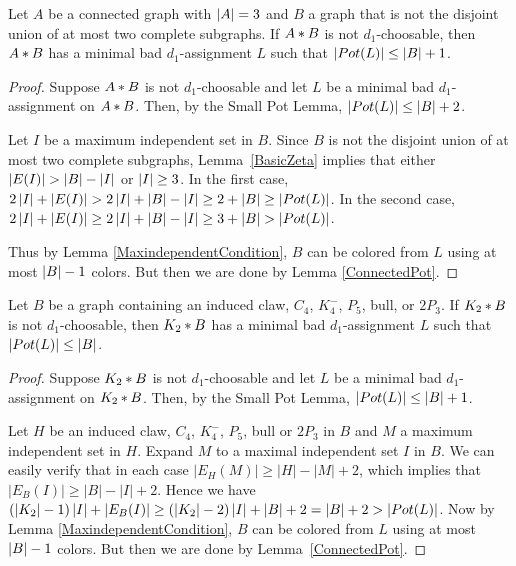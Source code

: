 \begin{lem}\label{ConnectedEqual3}
Let $A$ be a connected graph with $\left|A\right| = 3$ and $B$ a graph that is not the disjoint union of at most two complete subgraphs.  If $A \mbox{\hspace{2 pt}$\ast$\hspace{2 pt}} B$ is not $d_1$-choosable, then $A \mbox{\hspace{2 pt}$\ast$\hspace{2 pt}} B$ has a minimal bad $d_1$-assignment $L$ such that $\left|Pot(L)\right| \leq \left|B\right| + 1$.
\end{lem}
\begin{proof}
Suppose $A \mbox{\hspace{2 pt}$\ast$\hspace{2 pt}} B$ is not $d_1$-choosable and let $L$ be a minimal bad $d_1$-assignment on $A \mbox{\hspace{2 pt}$\ast$\hspace{2 pt}} B$.  Then, by the Small Pot Lemma, $\left|Pot(L)\right| \leq \left|B\right| + 2$.  

Let $I$ be a maximum independent set in $B$. Since $B$ is not the disjoint union of
at most two complete subgraphs, Lemma~\ref{BasicZeta} implies that either
$\left|E(I)\right| > \left|B\right| - \left|I\right|$ or $\left|I\right| \geq 3$.  In the first case, $2\left|I\right| + \left|E(I)\right| > 2\left|I\right| + \left|B\right| - \left|I\right| \geq 2 + \left|B\right| \geq \left|Pot(L)\right|$.  In the second case, 
$2\left|I\right| + \left|E(I)\right| \geq 2\left|I\right| + \left|B\right| - \left|I\right| \geq 3 + \left|B\right| > \left|Pot(L)\right|$.

Thus by Lemma \ref{MaxindependentCondition}, $B$ can be colored from $L$ using at most $\left|B\right| - 1$ colors.  But then we are done by Lemma \ref{ConnectedPot}.
\end{proof}

\begin{lem}\label{ConnectedIsK2}
Let $B$ be a graph containing an induced claw, $C_4$, $K_4^-$, $P_5$, bull, or $2P_3$. If $K_2 \mbox{\hspace{2 pt}$\ast$\hspace{2 pt}} B$ is not $d_1$-choosable, then $K_2 \mbox{\hspace{2 pt}$\ast$\hspace{2 pt}} B$ has a minimal bad $d_1$-assignment $L$ such that $\left|Pot(L)\right| \leq \left|B\right|$.
\end{lem}
\begin{proof}
Suppose $K_2 \mbox{\hspace{2 pt}$\ast$\hspace{2 pt}} B$ is not $d_1$-choosable and let $L$ be a minimal bad $d_1$-assignment on $K_2 \mbox{\hspace{2 pt}$\ast$\hspace{2 pt}} B$.  Then, by the Small Pot Lemma, $\left|Pot(L)\right| \leq \left|B\right| + 1$. 

Let $H$ be an induced claw, $C_4$, $K_4^-$, $P_5$, bull or $2P_3$ in $B$ and $M$ a maximum independent set in $H$.  Expand $M$ to a maximal independent set $I$ in $B$. 
We can easily verify that in each case $|E_H(M)|\ge |H|-|M|+2$, which implies that $|E_B(I)|\ge
|B|-|I|+2$.  Hence we have $(\left|K_2\right| - 1)\left|I\right| + \left|E_B(I)\right| \geq
(\left|K_2\right| - 2)\left|I\right| + \left|B\right| + 2 = \left|B\right| + 2 > \left|Pot(L)\right|$.  Now by Lemma \ref{MaxindependentCondition}, $B$ can be colored from $L$ using at most $\left|B\right| - 1$ colors.  But then we are done by Lemma~\ref{ConnectedPot}.
\end{proof}

